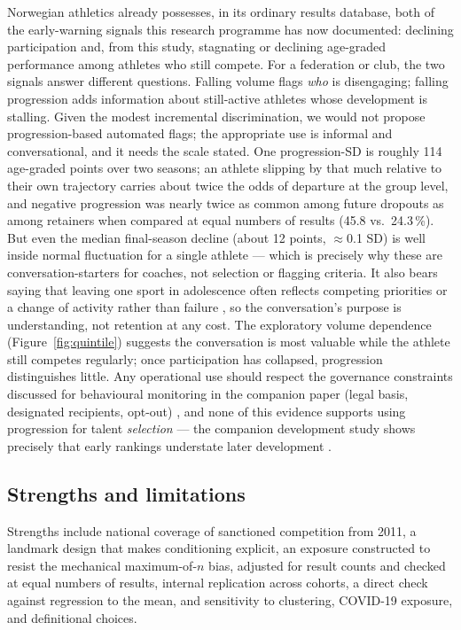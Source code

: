 \documentclass[12pt,a4paper]{article}
\begin{document}
Norwegian athletics already possesses, in its ordinary results database, both of the early-warning signals this research programme has now documented: declining participation \cite{guttormsen2026dropout} and, from this study, stagnating or declining age-graded performance among athletes who still compete. For a federation or club, the two signals answer different questions. Falling volume flags \emph{who} is disengaging; falling progression adds information about still-active athletes whose development is stalling. Given the modest incremental discrimination, we would not propose progression-based automated flags; the appropriate use is informal and conversational, and it needs the scale stated. One progression-SD is roughly 114 age-graded points over two seasons; an athlete slipping by that much relative to their own trajectory carries about twice the odds of departure at the group level, and negative progression was nearly twice as common among future dropouts as among retainers when compared at equal numbers of results (45.8 vs.\ 24.3\,\%). But even the median final-season decline (about 12 points, $\approx$0.1 SD) is well inside normal fluctuation for a single athlete --- which is precisely why these are conversation-starters for coaches, not selection or flagging criteria. It also bears saying that leaving one sport in adolescence often reflects competing priorities or a change of activity rather than failure \cite{crane2015,fraserthomas2008}, so the conversation's purpose is understanding, not retention at any cost. The exploratory volume dependence (Figure~\ref{fig:quintile}) suggests the conversation is most valuable while the athlete still competes regularly; once participation has collapsed, progression distinguishes little. Any operational use should respect the governance constraints discussed for behavioural monitoring in the companion paper (legal basis, designated recipients, opt-out) \cite{guttormsen2026dropout}, and none of this evidence supports using progression for talent \emph{selection} --- the companion development study shows precisely that early rankings understate later development \cite{guttormsen2026development}.

\subsection{Strengths and limitations}

Strengths include national coverage of sanctioned competition from 2011, a landmark design that makes conditioning explicit, an exposure constructed to resist the mechanical maximum-of-$n$ bias, adjusted for result counts and checked at equal numbers of results, internal replication across cohorts, a direct check against regression to the mean, and sensitivity to clustering, COVID-19 exposure, and definitional choices.
\end{document}
